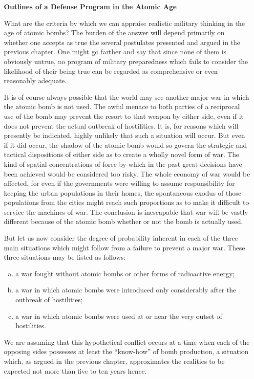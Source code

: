 \label{II-Retaliation2}

\vspace{12pt}

\noindent\textbf{Outlines of a Defense Program in the Atomic Age}

\vspace{10pt}

What are the criteria by which we can appraise realistic military thinking in the age of atomic bombs? The burden of the answer will depend primarily on whether one accepts as true the several postulates presented and argued in the previous chapter. One might go farther and say that since none of them is obviously untrue, no program of military preparedness which fails to consider the likelihood of their being true can be regarded as comprehensive or even reasonably adequate.

It is of course always possible that the world may see another major war in which the atomic bomb is not used. The awful menace to both parties of a reciprocal use of the bomb may prevent the resort to that weapon by either side, even if it does not prevent the actual outbreak of hostilities. It is, for reasons which will presently be indicated, highly unlikely that such a situation will occur. But even if it did occur, the shadow of the atomic bomb would so govern the strategic and tactical dispositions of either side as to create a
wholly novel form of war. The kind of spatial concentrations of force by which in the past great decisions have been achieved would be considered too risky. The whole economy of war would be affected, for even if the governments were willing to assume responsibility for keeping the urban populations in their homes, the spontaneous exodus of those populations from the cities might reach such proportions as to make it difficult to service the machines of war. The conclusion is inescapable that war will be vastly different because of the atomic bomb whether or not the bomb is actually used.

But let us now consider the degree of probability inherent in each of the three main situations which might follow from a failure to prevent a major war. These three situations may be listed as follows:
\begin{enumerate}[(a)]
\item a war fought without atomic bombs or other forms of radioactive energy;
\item a war in which atomic bombs were introduced only considerably after the outbreak of hostilities;
\item a war in which atomic bombs were used at or near the very outset of hostilities.
\end{enumerate}
\noindent We are assuming that this hypothetical conflict occurs at a time when each of the opposing sides possesses at least the ``know-how'' of bomb production, a situation which, as argued in the previous chapter, approximates the realities to be expected not more than five to ten years hence.

